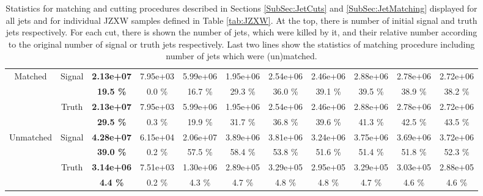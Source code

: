 \begin{appendices}
\begin{landscape}
\begin{table}
\begin{tabular}{|c|c|>{\bfseries}c|c|c|c|c|c|c|c|c|}
    \hline                                                              
    \multirow{4}{*}{Matched}        & \multirow{2}{*}{Signal}   & 2.13e+07 & 7.95e+03 & 5.99e+06 & 1.95e+06 & 2.54e+06 & 2.46e+06 & 2.88e+06 & 2.78e+06 & 2.72e+06 \\
                                    &                           & 19.5 \%  & 0.0 \%   & 16.7 \%  & 29.3 \%  & 36.0 \%  & 39.1 \%  & 39.5 \%  & 38.9 \%  & 38.2 \%  \\
    \cline{2-11}                                                                                    
                                    & \multirow{2}{*}{Truth}    & 2.13e+07 & 7.95e+03 & 5.99e+06 & 1.95e+06 & 2.54e+06 & 2.46e+06 & 2.88e+06 & 2.78e+06 & 2.72e+06 \\
                                    &                           & 29.5 \%  & 0.3 \%   & 19.9 \%  & 31.7 \%  & 36.8 \%  & 39.6 \%  & 41.3 \%  & 42.5 \%  & 43.5 \%  \\
    \hline                                                              
    \hline                                                              
    \multirow{4}{*}{Unmatched}      & \multirow{2}{*}{Signal}   & 4.28e+07 & 6.15e+04 & 2.06e+07 & 3.89e+06 & 3.81e+06 & 3.24e+06 & 3.75e+06 & 3.69e+06 & 3.72e+06 \\
                                    &                           & 39.0 \%  & 0.2 \%   & 57.5 \%  & 58.4 \%  & 53.8 \%  & 51.6 \%  & 51.4 \%  & 51.8 \%  & 52.3 \%  \\
    \cline{2-11}                                                                                    
                                    & \multirow{2}{*}{Truth}    & 3.14e+06 & 7.51e+03 & 1.30e+06 & 2.89e+05 & 3.29e+05 & 2.95e+05 & 3.29e+05 & 3.03e+05 & 2.88e+05 \\
                                    &                           & 4.4 \%   & 0.2 \%   & 4.3 \%   & 4.7 \%   & 4.8 \%   & 4.8 \%   & 4.7 \%   & 4.6 \%   & 4.6 \%   \\
    \hline
  \end{tabular}
  \caption{Statistics for matching and cutting procedures described in Sections
  \ref{SubSec:JetCuts} and \ref{SubSec:JetMatching} displayed for all jets and for
  individual JZXW samples defined in Table \ref{tab:JZXW}. At the top, there is
  number of initial signal and truth jets respectively. For each cut, there is
  shown the number of jets, which were killed by it, and their relative number
  according to the original number of signal or truth jets respectively.
  Last two lines show the statistics of matching procedure including number of
  jets which were (un)matched.}
  \label{tab:CutAndMatchingEfficiency}
\end{table} 
\end{landscape}


\end{appendices}
